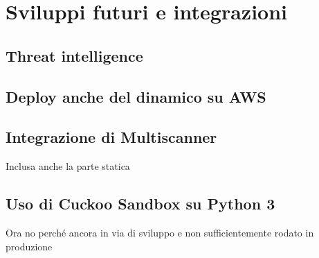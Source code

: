 \chapter{Sviluppi futuri e integrazioni}

\section{Threat intelligence}

\section{Deploy anche del dinamico su AWS}

\section{Integrazione di Multiscanner}
Inclusa anche la parte statica

\section{Uso di Cuckoo Sandbox su Python 3}
Ora no perché ancora in via di sviluppo e non sufficientemente rodato in produzione